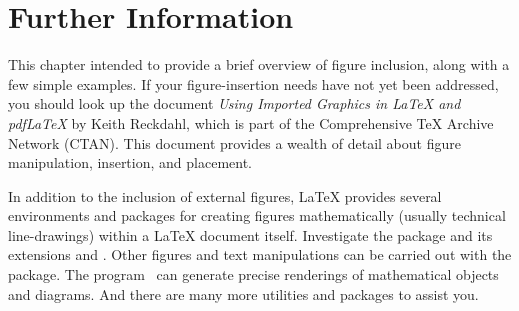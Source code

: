 \section{Further Information}
This chapter intended to provide a brief overview of figure inclusion,
along with a few simple examples.  If your figure-insertion needs have
not yet been addressed, you should look up the document \textit{Using
  Imported Graphics in \LaTeX{} and pdf\LaTeX} by Keith Reckdahl,
which is part of the Comprehensive \TeX{} Archive Network (CTAN).
This document provides a wealth of detail about figure manipulation,
insertion, and placement.

In addition to the inclusion of external figures, \LaTeX{} provides
several environments and packages for creating figures mathematically
(usually technical line-drawings) within a \LaTeX{} document itself.
Investigate the  package and its extensions 
and .  Other figures and text manipulations can be carried
out with the  package.  The program \MP\ can generate
precise renderings of mathematical objects and diagrams.  And there
are many more utilities and packages to assist you.


